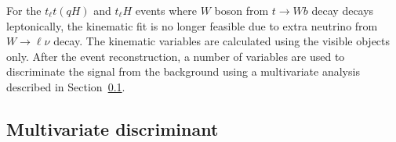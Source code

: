 For the  $t_{\ell}t(qH)$ and $t_{\ell}H$ events where $W$ boson from $t\to W b$ decay decays leptonically,
the kinematic fit is no longer feasible due to extra neutrino from $W\rightarrow \ell\nu$ decay. The kinematic variables are calculated using the visible
objects only. After the event reconstruction, a number of variables are used to discriminate the signal from the background using a multivariate analysis described
in Section~\ref{sec:tmva}.



\subsection{Multivariate discriminant}
\label{sec:tmva}

